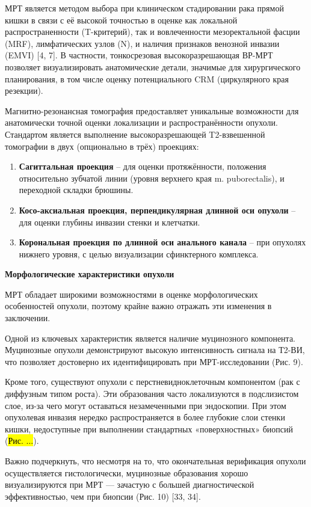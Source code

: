 \documentclass[
  russian,
  12pt,
  a4paper,
]{report}
\begin{document}
МРТ является методом выбора при клиническом стадировании рака прямой
кишки в связи с её высокой точностью в оценке как локальной
распространенности (T-критерий), так и вовлеченности мезоректальной
фасции (MRF), лимфатических узлов (N), и наличия признаков венозной
инвазии (EMVI) {[}4, 7{]}. В частности, тонкосрезовая высокоразрешающая
ВР-МРТ позволяет визуализировать анатомические детали, значимые для
хирургического планирования, в том числе оценку потенциального CRM
(циркулярного края резекции).

Магнитно-резонансная томография предоставляет уникальные возможности для
анатомически точной оценки локализации и распространённости опухоли.
Стандартом является выполнение высокоразрешающей T2-взвешенной
томографии в двух (опционально в трёх) проекциях:

\begin{enumerate}
\def\labelenumi{\arabic{enumi}.}
\item
  \textbf{Сагиттальная проекция} -- для оценки протяжённости, положения
  относительно зубчатой линии (уровня верхнего края m. puborectalis), и
  переходной складки брюшины.
\item
  \textbf{Косо-аксиальная проекция, перпендикулярная длинной оси
  опухоли} -- для оценки глубины инвазии стенки и клетчатки.
\item
  \textbf{Корональная проекция по длинной оси анального канала} -- при
  опухолях нижнего уровня, с целью визуализации сфинктерного комплекса.
\end{enumerate}

\textbf{Морфологические характеристики опухоли}

МРТ обладает широкими возможностями в оценке морфологических
особенностей опухоли, поэтому крайне важно отражать эти изменения в
заключении.

Одной из ключевых характеристик является наличие муцинозного компонента.
Муцинозные опухоли демонстрируют высокую интенсивность сигнала на Т2-ВИ,
что позволяет достоверно их идентифицировать при МРТ-исследовании (Рис.
9).

Кроме того, существуют опухоли с перстневидноклеточным компонентом (рак
с диффузным типом роста). Эти образования часто локализуются в
подслизистом слое, из-за чего могут оставаться незамеченными при
эндоскопии. При этом опухолевая инвазия нередко распространяется в более
глубокие слои стенки кишки, недоступные при выполнении стандартных
«поверхностных» биопсий (\hl{Рис. ...}).

Важно подчеркнуть, что несмотря на то, что окончательная верификация
опухоли осуществляется гистологически, муцинозные образования хорошо
визуализируются при МРТ --- зачастую с большей диагностической
эффективностью, чем при биопсии (Рис. 10) {[}33, 34{]}.
\end{document}
